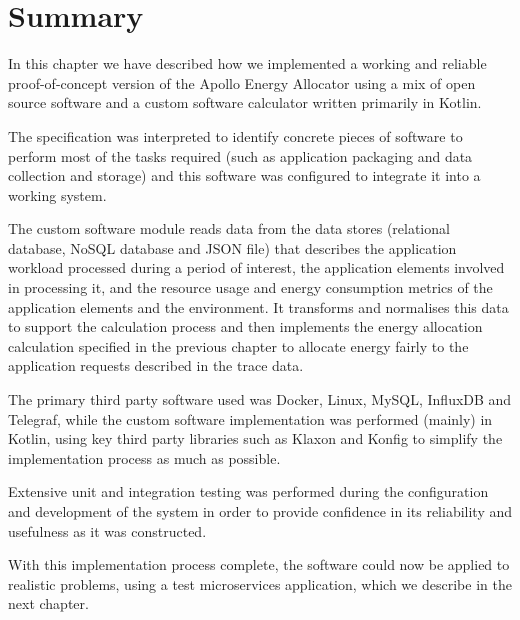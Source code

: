 \section{Summary}

In this chapter we have described how we implemented a working and reliable proof-of-concept version of the Apollo Energy Allocator using a mix of open source software and a custom software calculator written primarily in Kotlin.

The specification was interpreted to identify concrete pieces of software to perform most of the tasks required (such as application packaging and data collection and storage) and this software was configured to integrate it into a working system.

The custom software module reads data from the data stores (relational database, NoSQL database and JSON file) that describes the application workload processed during a period of interest, the application elements involved in processing it, and the resource usage and energy consumption metrics of the application elements and the environment.  It transforms and normalises this data to support the calculation process and then implements the energy allocation calculation specified in the previous chapter to allocate energy fairly to the application requests described in the trace data.

The primary third party software used was Docker, Linux, MySQL, InfluxDB and Telegraf, while the custom software implementation was performed (mainly) in Kotlin, using key third party libraries such as Klaxon and Konfig to simplify the implementation process as much as possible.

Extensive unit and integration testing was performed during the configuration and development of the system in order to provide confidence in its reliability and usefulness as it was constructed.

With this implementation process complete, the software could now be applied to realistic problems, using a test microservices application, which we describe in the next chapter.


